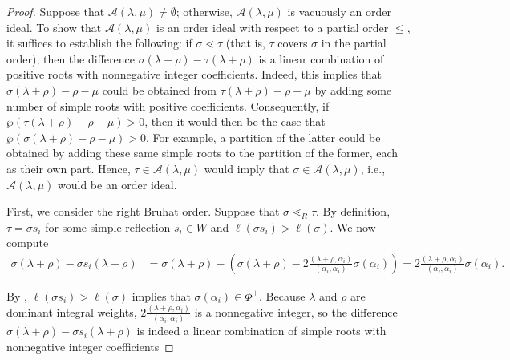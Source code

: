 \documentclass{amsart}
\theoremstyle{definition}
\newcommand{\calA}{\mathcal{A}}
\begin{document}
\begin{proof}
Suppose that $\calA(\lambda,\mu)\neq\emptyset$; otherwise, $\calA(\lambda,\mu)$ is vacuously an order ideal. To show that $\calA(\lambda,\mu)$ is an order ideal with respect to a partial order $\leq$, it suffices to establish the following: if $\sigma\lessdot\tau$ (that is, $\tau$ covers $\sigma$ in the partial order), then the difference $\sigma(\lambda+\rho)-\tau(\lambda+\rho)$ is a linear combination of positive roots with nonnegative integer coefficients.
Indeed, this implies that $\sigma(\lambda+\rho)-\rho-\mu$ could be obtained from $\tau(\lambda+\rho)-\rho-\mu$ by adding some number of simple roots with positive coefficients. 
Consequently, if $\wp(\tau(\lambda+\rho)-\rho-\mu)>0$, then it would then be the case that $\wp(\sigma(\lambda+\rho)-\rho-\mu)>0$.
For example, a partition of the latter could be obtained by adding these same simple roots to the partition of the former, each as their own part.
Hence, $\tau\in \calA(\lambda,\mu)$ would imply that $\sigma\in \calA(\lambda,\mu)$, i.e., $\calA(\lambda,\mu)$ would be an order ideal.

First, we consider the right Bruhat order.
Suppose that $\sigma\lessdot_R\tau$. 
By definition, $\tau=\sigma s_i$ for some simple reflection $s_i\in W$ and $\ell(\sigma s_i)>\ell(\sigma)$. 
We now compute
\begin{align*}
      \sigma(\lambda+\rho)-\sigma s_i(\lambda+\rho)&=\sigma(\lambda+\rho)-\left(\sigma(\lambda+\rho)-2\frac{(\lambda+\rho,\alpha_i)}{(\alpha_i,\alpha_i)}\sigma(\alpha_i)\right)=2\frac{(\lambda+\rho,\alpha_i)}{(\alpha_i,\alpha_i)}\sigma(\alpha_i).
    \end{align*}

    By \cite[Equation 4.25]{bjorner2005combinatorics}, $\ell(\sigma s_i)>\ell(\sigma)$ implies that $\sigma(\alpha_i)\in\Phi^+$. Because $\lambda$ and $\rho$ are dominant integral weights, $2\frac{(\lambda+\rho,\alpha_i)}{(\alpha_i,\alpha_i)}$ is a nonnegative integer, so the difference $\sigma(\lambda+\rho)-\sigma s_i(\lambda+\rho)$ is indeed a linear combination of simple roots with nonnegative integer coefficients


\end{proof}
\end{document}
